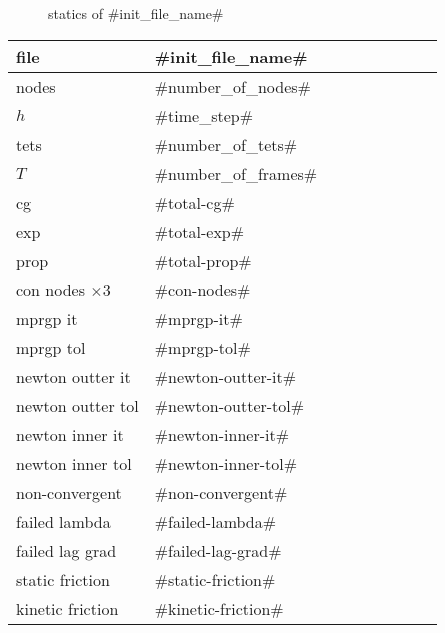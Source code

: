 
\begin{figure}
  \centering
  \caption{statics of #init_file_name#}
  \label{en_f}
\end{figure}

\begin{center}
  \begin{tabular}{|l*{8}{|l}}
    \hline
	file & #init_file_name# \\ \hline
	nodes & #number_of_nodes# \\ \hline
	$h$ & #time_step# \\ \hline
	tets & #number_of_tets# \\ \hline
	$T$ & #number_of_frames# \\ \hline
	cg & #total-cg# \\ \hline
	exp & #total-exp# \\ \hline
	prop & #total-prop# \\ \hline
    con nodes $\times 3$ & #con-nodes# \\ \hline
    mprgp it & #mprgp-it# \\ \hline
	mprgp tol & #mprgp-tol# \\ \hline
    newton outter it & #newton-outter-it# \\ \hline
	newton outter tol & #newton-outter-tol# \\ \hline
	newton inner it & #newton-inner-it# \\ \hline
	newton inner tol & #newton-inner-tol# \\ \hline
    non-convergent & #non-convergent# \\ \hline
    failed lambda & #failed-lambda# \\ \hline
    failed lag grad & #failed-lag-grad# \\ \hline
    static friction & #static-friction# \\ \hline
    kinetic friction & #kinetic-friction# \\ \hline
  \end{tabular}
\end{center}

